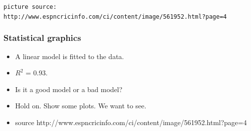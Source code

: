 \documentclass{beamer}
\begin{document}
\begin{frame}
\begin{columns}
		\begin{column}{0.5\textwidth}
			 \begin{center}  \end{center}
		\end{column}
		
	\end{columns} 
	
\texttt {\tiny picture source: http://www.espncricinfo.com/ci/content/image/561952.html?page=4}	
	
\end{frame}


\begin{frame}
  \frametitle{Statistical graphics}
  
		  \begin{itemize}
			  \item A linear model is fitted to the data.
			  \item $R^2$ = 0.93.
			  \item Is it a good model or a bad model?
			  \item Hold on. Show some plots. We want to see.
			  \item source http://www.espncricinfo.com/ci/content/image/561952.html?page=4
		  \end{itemize}		
\end{frame}
\end{document}

